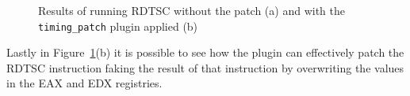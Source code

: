 \begin{figure}%
    \centering
    \caption{Results of running RDTSC without the patch (a) and with the \lstinline{timing_patch} plugin applied (b)}%
    \label{fig:rdtsc1}%
\end{figure}

Lastly in Figure~\ref{fig:rdtsc1}(b) it is possible to see how the plugin can effectively patch the RDTSC instruction faking the result of that instruction by overwriting the values in the EAX and EDX registries. 

